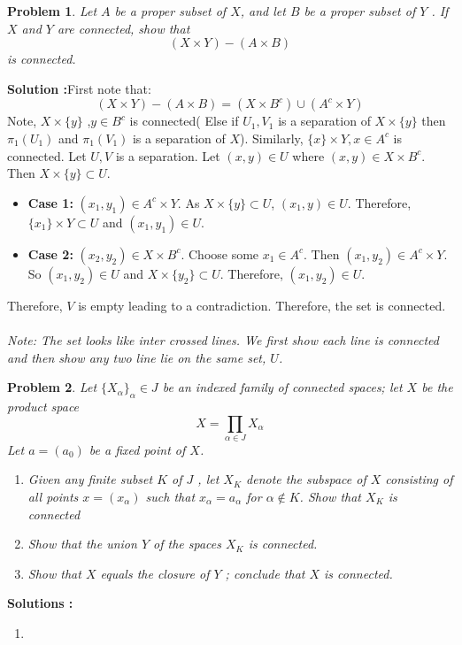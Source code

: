 \documentclass{article}
\newtheorem{problem}{Problem}
\numberwithin{problem}{section}
\begin{document}
\begin{tcolorbox}
\begin{problem}
  Let $A$ be a proper subset of $X$, and let $B$ be a proper subset of $Y$ . If $X$ and $Y$ are
connected, show that
$$(X\times Y)-(A\times B)$$
is connected.
\end{problem}
\end{tcolorbox}
\textbf{Solution :}First note that:
$$(X\times Y)-(A\times B)=\left(X\times B^c\right)\cup \left(A^c\times Y\right)$$
Note, $X\times\{y\}$ ,$y\in B^c$  is connected( Else if $U_1,V_1$ is a separation of $X\times\{y\}$ then $\pi_1(U_1)$ and $\pi_1(V_1)$ is a separation of $X$). Similarly, $\{x\}\times Y,x\in A^c$ is connected. Let $U,V$ is a separation. Let $(x,y)\in U$ where $(x,y)\in X\times B^c$. Then $X\times\{y\}\subset U$.
\begin{itemize}
    \item \textbf{Case 1:} $(x_1,y_1)\in A^c\times Y$. As $X\times\{y\}\subset U$, $(x_1,y)\in U$. Therefore, $\{x_1\}\times Y\subset U$ and $(x_1,y_1)\in U$.
    \item \textbf{Case 2:} $(x_2,y_2)\in X\times B^c$. Choose some $x_1\in A^c$. Then $(x_1,y_2)\in A^c\times Y$. So $(x_1,y_2)\in U$ and $X\times\{y_2\}\subset U$. Therefore, $(x_1,y_2)\in U$.
\end{itemize}
Therefore, $V$ is empty leading to a contradiction. Therefore, the set is connected.\\\\
\textit{Note: The set looks like inter crossed lines. We first show each line is connected and then show any two line lie on the same set, $U$.}




\begin{tcolorbox}
\begin{problem}
  Let $\{X_\alpha\}_\alpha\in J$ be an indexed family of connected spaces; let $X$ be the product
space
$$X=\prod_{\alpha\in J}X_\alpha $$
Let $a=(a_0)$ be a fixed point of $X$. 
\begin{enumerate}
    \item Given any finite subset $K$ of $J$ , let $X_K$ denote the subspace of $X$ consisting
of all points $x = (x_\alpha)$ such that $x_\alpha = a_\alpha$ for $\alpha\notin K$. Show that 
$X_K$ is
connected
    \item Show that the union $Y$ of the spaces $X_K$ is connected.
    \item Show that $X$ equals the closure of $Y$ ; conclude that $X$ is connected.
\end{enumerate}
\end{problem}
\end{tcolorbox}
\textbf{Solutions :}
\begin{enumerate}
    \item 
\end{enumerate}
\end{document}
